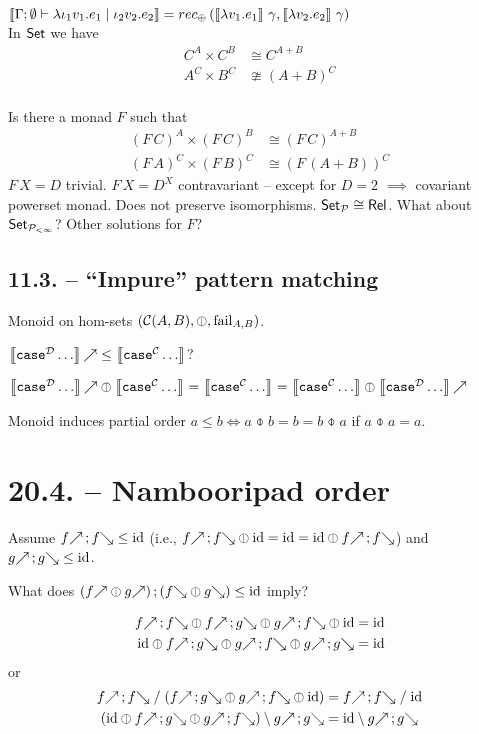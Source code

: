 \documentclass[runningheads,envcountsame]{llncs}
\begin{document}
\begin{itemize}
          $\sem{\Gamma; \emptyset \vdash \lambda \iota_1 v_1. e_1 \mid \iota_2 v_2. e_2} = rec_\oplus\,(\sem{\lambda v_1. e_1}\,\gamma, \sem{\lambda v_2. e_2}\,\gamma)$ \\
          In $\mathsf{Set}$ we have \begin{align}
              C^A \times C^B &\cong C^{A+B} \\
              A^C \times B^C &\ncong {(A+B)}^C
          \end{align} \\
          Is there a monad $F$ such that \begin{align}
              (F\,C)^A \times (F\,C)^B &\cong (F\,C)^{A+B} \\
              (F\,A)^C \times (F\,B)^C &\cong {(F\,(A+B))}^C
          \end{align}
          $F\,X=D$ trivial. $F\,X=D^X$ contravariant -- except for $D=2$ $\implies$ covariant powerset monad. Does not preserve isomorphisms. $\mathsf{Set}_\mathcal{P} \cong \mathsf{Rel}$. What about $\mathsf{Set}_{\mathcal{P}_{<\infty}}$? Other solutions for $F$?
\end{itemize}

\subsection{11.3. -- “Impure” pattern matching}

Monoid on hom-sets $(\homC{A}{B}, \obar, \fail_{A, B})$.

$\f{\sem{\mathtt{case}^\D \dots}} \leq \sem{\mathtt{case}^\C \dots}$?

$\f{\sem{\mathtt{case}^\D \dots}} \obar \sem{\mathtt{case}^\C \dots} = \sem{\mathtt{case}^\C \dots} = \sem{\mathtt{case}^\C \dots} \obar \f{\sem{\mathtt{case}^\D \dots}}$

Monoid induces partial order $a \leq b \iff a \obar b = b = b \obar a$ if $a \obar a = a$.

\section{20.4. -- Nambooripad order}

Assume $\comp{\f{f}}{\b{f}} \leq \id$ (i.e., $\comp{\f{f}}{\b{f}} \obar \id = \id = \id \obar \comp{\f{f}}{\b{f}}$) and $\comp{\f{g}}{\b{g}} \leq \id$.

What does $\comp{(\f{f} \obar \f{g})}{(\b{f} \obar \b{g})} \leq \id$ imply?

\begin{align}
\comp{\f{f}}{\b{f}} \obar \comp{\f{f}}{\b{g}} \obar \comp{\f{g}}{\b{f}} \obar \id &= \id \\
\id \obar \comp{\f{f}}{\b{g}} \obar \comp{\f{g}}{\b{f}} \obar \comp{\f{g}}{\b{g}} &= \id
\end{align}
or 
\begin{align}
\comp{\f{f}}{\b{f}} \mathrel{/} (\comp{\f{f}}{\b{g}} \obar \comp{\f{g}}{\b{f}} \obar \id) &= \comp{\f{f}}{\b{f}} \mathrel{/} \id \\
(\id \obar \comp{\f{f}}{\b{g}} \obar \comp{\f{g}}{\b{f}}) \setminus \comp{\f{g}}{\b{g}} &= \id \setminus \comp{\f{g}}{\b{g}}
\end{align}
\end{document}
